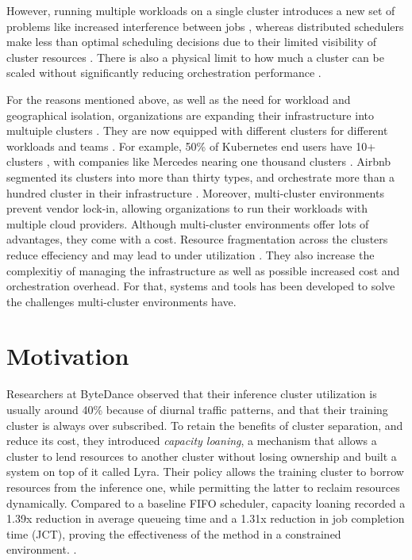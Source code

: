 However, running multiple workloads on a single cluster introduces a new set of
problems like increased interference between jobs \cite{garg_workload_2017},
whereas distributed schedulers make less than optimal scheduling decisions due
to their limited visibility of cluster resources \cite{karanasos_mercury_2015,
delgado_hawk_2015}. There is also a physical limit to how much a cluster can be
scaled without significantly reducing orchestration performance
\cite{noauthor_considerations_nodate}. 

For the reasons mentioned above, as well as the need for workload and
geographical isolation, organizations are expanding their infrastructure into
multuiple clusters \cite{noauthor_multi-cluster_nodate}. They are now equipped
with different clusters for different workloads and teams
\cite{patel_what_2022, li_lyra_2023}. For example, 50\% of Kubernetes
\cite{verma_large-scale_2015} end users have 10+ clusters
\cite{noauthor_cncf_2023}, with companies like Mercedes nearing one thousand
clusters \cite{noauthor_mercedes-benz_2023}. Airbnb segmented its clusters into
more than thirty types, and orchestrate more than a hundred cluster in their
infrastructure \cite{noauthor_dynamic_nodate-1}. Moreover, multi-cluster
environments prevent vendor lock-in, allowing organizations to run their
workloads with multiple cloud providers. Although multi-cluster environments
offer lots of advantages, they come with a cost. Resource fragmentation across
the clusters reduce effeciency and may lead to under utilization
\cite{noauthor_kubernetes_nodate}. They also increase the complexitiy of
managing the infrastructure as well as possible increased cost and
orchestration overhead. For that, systems and tools has been developed to solve
the challenges multi-cluster environments have. 


\section{Motivation}

Researchers at ByteDance observed that their inference cluster utilization is
usually around 40\% because of diurnal traffic patterns, and that their
training cluster is always over subscribed. To retain the benefits of cluster
separation, and reduce its cost, they introduced \textit{capacity loaning}, a
mechanism that allows a cluster to lend resources to another cluster without
losing ownership and built a system on top of it called Lyra. Their policy
allows the training cluster to borrow resources from the inference one, while
permitting the latter to reclaim resources dynamically. Compared to a baseline
FIFO scheduler, capacity loaning recorded a 1.39x reduction in average queueing
time and a 1.31x reduction in job completion time (JCT), proving the
effectiveness of the method in a constrained environment. \cite{li_lyra_2023}.

